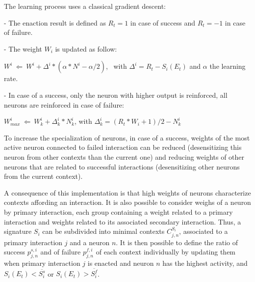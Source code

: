 \documentclass[conference]{IEEEtran}
\begin{document}
The learning process uses a classical gradient descent:


- The enaction result is defined as $R_t=1$ in case of success and $R_t=-1$ in case of failure.

- The weight $W_i$ is updated as follow:

$W^i ~\Leftarrow~ W^i+ \Delta^i * (\alpha * N^i - \alpha /2)$, ~with $\Delta^i=R_t-S_i(E_t)$
and $\alpha$ the learning rate.

- In case of a success, only the neuron with higher output is reinforced, all neurons are reinforced in case of failure:

$W_{max}^i ~\Leftarrow~ W_k^i+ \Delta_k^i * N_k^i$,
with $\Delta_k^i=(R_t*W_i + 1)/2 - N_k^i$


To increase the specialization of neurons, in case of a success, weights of the most active neuron connected to failed interaction can be reduced (desensitizing this neuron from other contexts than the current one) and reducing weights of other neurons that are related to successful interactions (desensitizing other neurons from the current context).


A consequence of this implementation is that high weights of neurons characterize contexts affording an interaction. It is also possible to consider weighs of a neuron by primary interaction, each group containing a weight related to a primary interaction and weights related to its associated secondary interaction. Thus, a signature $S_i$ can be subdivided into minimal contexts $C_{j,n}^{S_i}$, associated to a primary interaction $j$ and a neuron $n$. It is then possible to define the ratio of success $p_{j,n}^{s,i}$ and of failure $p_{j,n}^{f,i}$ of each context individually by updating them when primary interaction $j$ is enacted and neuron $n$ has the highest activity, and $S_i(E_t)<\overline{S_i^s}$ or $S_i(E_t)>\overline{S_i^f}$.
\end{document}
